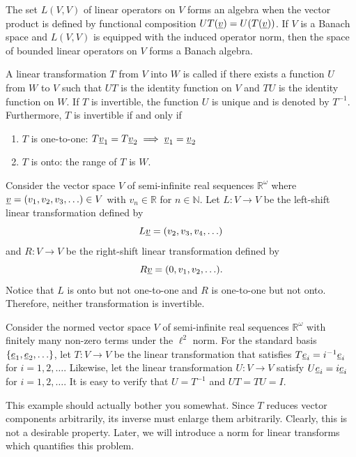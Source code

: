\begin{example}
The set $L(V,V)$ of linear operators on $V$ forms an algebra when the vector product is defined by functional composition $UT(\underline{v})=U(T(\underline{v}))$.
If $V$ is a Banach space and $L(V,V)$ is equipped with the induced operator norm, then the space of bounded linear operators on $V$ forms a Banach algebra.
\end{example}

\begin{definition}
A linear transformation $T$ from $V$ into $W$ is called  if there exists a function $U$ from $W$ to $V$ such that $UT$ is the identity function on $V$ and $TU$ is the identity function on $W$.
If $T$ is invertible, the function $U$ is unique and is denoted by $T^{-1}$.
Furthermore, $T$ is invertible if and only if
\begin{enumerate}
\item $T$ is one-to-one: $T \underline{v}_1 = T \underline{v}_2 \implies \underline{v}_1 = \underline{v}_2$
\item $T$ is onto: the range of $T$ is $W$.
\end{enumerate}
\end{definition}

\begin{example}
Consider the vector space $V$ of semi-infinite real sequences $\mathbb{R}^\omega$ where $\underline{v} = (v_1,v_2,v_3,\ldots)\in V$ with $v_n \in \mathbb{R}$ for $n\in \mathbb{N}$.
Let $L \colon V \rightarrow V$ be the left-shift linear transformation defined by
\[L \underline{v} = (v_2,v_3,v_4,\ldots) \]
and $R \colon V \rightarrow V$ be the right-shift linear transformation defined by
\[R \underline{v} = (0,v_1,v_2,\ldots). \]
Notice that $L$ is onto but not one-to-one and $R$ is one-to-one but not onto.
Therefore, neither transformation is invertible.
\end{example}

\begin{example}
Consider the normed vector space $V$ of semi-infinite real sequences $\mathbb{R}^\omega$ with finitely many non-zero terms under the $\ell^2$ norm.
For the standard basis $\{\underline{e}_1,\underline{e}_2,\ldots\}$, let $T \colon V \rightarrow V$ be the linear transformation that satisfies $T \underline{e}_i = i^{-1} \underline{e}_i$ for $i=1,2,\ldots$.
Likewise, let the linear transformation $U \colon V \rightarrow V$ satisfy $U \underline{e}_i = i \underline{e}_i$ for $i=1,2,\ldots$.
It is easy to verify that $U = T^{-1}$ and $UT = TU = I$.
\end{example}
This example should actually bother you somewhat.
Since $T$ reduces vector components arbitrarily, its inverse must enlarge them arbitrarily.
Clearly, this is not a desirable property.
Later, we will introduce a norm for linear transforms which quantifies this problem.

